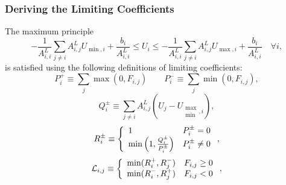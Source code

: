 \subsubsection{Deriving the Limiting Coefficients}
\begin{lemma}\label{ss_coef}
   The maximum principle
   \begin{equation}
      -\frac{1}{A^L_{i,i}}\sum\limits_{j\ne i} A^L_{i,j}
      U_{\min,i}
      + \frac{b_i}{A^L_{i,i}}
      \leq U_i\leq
      -\frac{1}{A^L_{i,i}}\sum\limits_{j\ne i} A^L_{i,j}
      U_{\max,i}
      + \frac{b_i}{A^L_{i,i}}\quad\forall i,
   \end{equation}
   is satisfied using the following definitions of limiting coefficients:
   \begin{equation}\label{P_defs}
      P_i^+ \equiv \sum\limits_j\max(0,F_{i,j}) \qquad
      P_i^- \equiv \sum\limits_j\min(0,F_{i,j}),
   \end{equation}
   \begin{equation}
      Q_i^\pm \equiv \sum\limits_{j\ne i}A_{i,j}^L(U_j - U_{\substack{\max\\\min},i}),
   \end{equation}
   \begin{equation}\label{R_defs}
      R_i^\pm \equiv\left\{
         \begin{array}{l l}
            1                                          & P_i^\pm = 0\\
            \min\left(1,\frac{Q_i^\pm}{P_i^\pm}\right) & P_i^\pm \ne 0
         \end{array}
         \right.,
   \end{equation}
   \begin{equation}\label{L_defs}
      \mathcal{L}_{i,j} \equiv\left\{
         \begin{array}{l l}
            \min(R_i^+,R_j^-) & F_{i,j} \geq 0\\
            \min(R_i^-,R_j^+) & F_{i,j} < 0
         \end{array}
         \right.,
   \end{equation}   
\end{lemma}

